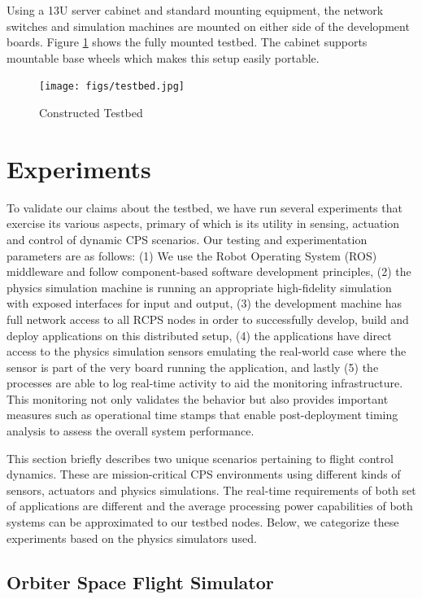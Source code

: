 Using a 13U server cabinet and standard mounting equipment, the network switches and simulation machines are mounted on either side of the development boards. Figure \ref{fig:testbed} shows the fully mounted testbed. The cabinet supports mountable base wheels which makes this setup easily portable. 

\begin{figure}[h]
	\centering
	\texttt{[image: figs/testbed.jpg]}
	\caption{Constructed Testbed}
	\label{fig:testbed}
\end{figure}

\section{Experiments}
\label{sec:Experiments}

To validate our claims about the testbed, we have run several experiments that exercise its various aspects, primary of which is its utility in sensing, actuation and control of dynamic CPS scenarios. Our testing and experimentation parameters are as follows: (1) We use the Robot Operating System (ROS) \cite{ROS} middleware and follow component-based software development principles, (2) the physics simulation machine is running an appropriate high-fidelity simulation with exposed interfaces for input and output, (3) the development machine has full network access to all RCPS nodes in order to successfully develop, build and deploy applications on this distributed setup, (4) the applications have direct access to the physics simulation sensors emulating the real-world case where the sensor is part of the very board running the application, and lastly (5) the processes are able to log real-time activity to aid the monitoring infrastructure. This monitoring not only validates the behavior but also provides important measures such as operational time stamps that enable post-deployment timing analysis to assess the overall system performance.

This section briefly describes two unique scenarios pertaining to flight control dynamics. These are mission-critical CPS environments using different kinds of sensors, actuators and physics simulations. The real-time requirements of both set of applications are different and the average processing power capabilities of both systems can be approximated to our testbed nodes. Below, we categorize these experiments based on the physics simulators used.

\subsection{Orbiter Space Flight Simulator}

